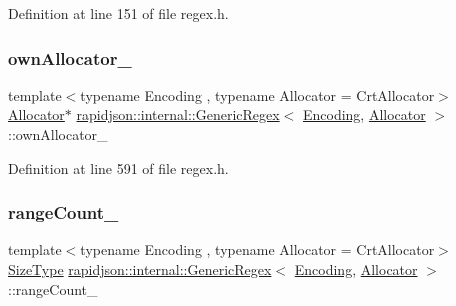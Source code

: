 Definition at line 151 of file regex.\+h.

\mbox{\label{classrapidjson_1_1internal_1_1_generic_regex_a20f2e467455922aa61d19886245ff687}} 
\subsubsection{\texorpdfstring{ownAllocator\_}{ownAllocator\_}}
{\footnotesize\ttfamily template$<$typename Encoding , typename Allocator  = Crt\+Allocator$>$ \\
\mbox{\hyperlink{classrapidjson_1_1_allocator}{Allocator}}$\ast$ \mbox{\hyperlink{classrapidjson_1_1internal_1_1_generic_regex}{rapidjson\+::internal\+::\+Generic\+Regex}}$<$ \mbox{\hyperlink{classrapidjson_1_1_encoding}{Encoding}}, \mbox{\hyperlink{classrapidjson_1_1_allocator}{Allocator}} $>$\+::own\+Allocator\+\_\+\hspace{0.3cm}{\ttfamily [private]}}



Definition at line 591 of file regex.\+h.

\mbox{\label{classrapidjson_1_1internal_1_1_generic_regex_afe77f4a8fd6725135b03c8bb5aca0909}} 
\subsubsection{\texorpdfstring{rangeCount\_}{rangeCount\_}}
{\footnotesize\ttfamily template$<$typename Encoding , typename Allocator  = Crt\+Allocator$>$ \\
\mbox{\hyperlink{namespacerapidjson_a44eb33eaa523e36d466b1ced64b85c84}{Size\+Type}} \mbox{\hyperlink{classrapidjson_1_1internal_1_1_generic_regex}{rapidjson\+::internal\+::\+Generic\+Regex}}$<$ \mbox{\hyperlink{classrapidjson_1_1_encoding}{Encoding}}, \mbox{\hyperlink{classrapidjson_1_1_allocator}{Allocator}} $>$\+::range\+Count\+\_\+\hspace{0.3cm}{\ttfamily [private]}}



